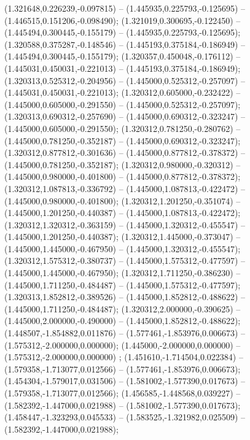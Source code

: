  (1.321648,0.226239,-0.097815) -- (1.445935,0.225793,-0.125695) -- (1.446515,0.151206,-0.098490);
 (1.321019,0.300695,-0.122450) -- (1.445494,0.300445,-0.155179) -- (1.445935,0.225793,-0.125695);
 (1.320588,0.375287,-0.148546) -- (1.445193,0.375184,-0.186949) -- (1.445494,0.300445,-0.155179);
 (1.320357,0.450048,-0.176112) -- (1.445031,0.450031,-0.221013) -- (1.445193,0.375184,-0.186949);
 (1.320313,0.525312,-0.204956) -- (1.445000,0.525312,-0.257097) -- (1.445031,0.450031,-0.221013);
 (1.320312,0.605000,-0.232422) -- (1.445000,0.605000,-0.291550) -- (1.445000,0.525312,-0.257097);
 (1.320313,0.690312,-0.257690) -- (1.445000,0.690312,-0.323247) -- (1.445000,0.605000,-0.291550);
 (1.320312,0.781250,-0.280762) -- (1.445000,0.781250,-0.352187) -- (1.445000,0.690312,-0.323247);
 (1.320312,0.877812,-0.301636) -- (1.445000,0.877812,-0.378372) -- (1.445000,0.781250,-0.352187);
 (1.320312,0.980000,-0.320312) -- (1.445000,0.980000,-0.401800) -- (1.445000,0.877812,-0.378372);
 (1.320312,1.087813,-0.336792) -- (1.445000,1.087813,-0.422472) -- (1.445000,0.980000,-0.401800);
 (1.320312,1.201250,-0.351074) -- (1.445000,1.201250,-0.440387) -- (1.445000,1.087813,-0.422472);
 (1.320312,1.320312,-0.363159) -- (1.445000,1.320312,-0.455547) -- (1.445000,1.201250,-0.440387);
 (1.320312,1.445000,-0.373047) -- (1.445000,1.445000,-0.467950) -- (1.445000,1.320312,-0.455547);
 (1.320312,1.575312,-0.380737) -- (1.445000,1.575312,-0.477597) -- (1.445000,1.445000,-0.467950);
 (1.320312,1.711250,-0.386230) -- (1.445000,1.711250,-0.484487) -- (1.445000,1.575312,-0.477597);
 (1.320313,1.852812,-0.389526) -- (1.445000,1.852812,-0.488622) -- (1.445000,1.711250,-0.484487);
 (1.320312,2.000000,-0.390625) -- (1.445000,2.000000,-0.490000) -- (1.445000,1.852812,-0.488622);
 (1.448507,-1.854882,0.011876) -- (1.577461,-1.853976,0.006673) -- (1.575312,-2.000000,0.000000);
 (1.445000,-2.000000,0.000000) -- (1.575312,-2.000000,0.000000) ;
 (1.451610,-1.714504,0.022384) -- (1.579358,-1.713077,0.012566) -- (1.577461,-1.853976,0.006673);
 (1.454304,-1.579017,0.031506) -- (1.581002,-1.577390,0.017673) -- (1.579358,-1.713077,0.012566);
 (1.456585,-1.448568,0.039227) -- (1.582392,-1.447000,0.021988) -- (1.581002,-1.577390,0.017673);
 (1.458447,-1.323293,0.045533) -- (1.583525,-1.321982,0.025509) -- (1.582392,-1.447000,0.021988);
